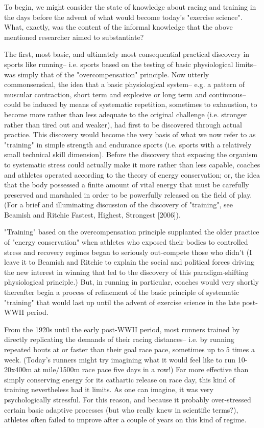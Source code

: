 To begin, we might consider the state of knowledge about racing and training in the days before the advent of what would become today's "exercise science". What, exactly, was the content of the informal knowledge that the above mentioned researcher aimed to substantiate?

The first, most basic, and ultimately most consequential practical discovery in sports like running-- i.e. sports based on the testing of basic physiological limits-- was simply that of the "overcompensation" principle. Now utterly commonsensical, the idea that a basic physiological system-- e.g. a pattern of muscular contraction, short term and explosive or long term and continuous-- could be induced by means of systematic repetition, sometimes to exhaustion, to become more rather than less adequate to the original challenge (i.e. stronger rather than tired out and weaker), had first to be discovered through actual practice. This discovery would become the very basis of what we now refer to as "training" in simple strength and endurance sports (i.e. sports with a relatively small technical skill dimension). Before the discovery that exposing the organism to systematic stress could actually make it more rather than less capable, coaches and athletes operated according to the theory of energy conservation; or, the idea that the body possessed a finite amount of vital energy that must be carefully preserved and marshaled in order to be powerfully released on the field of play. (For a brief and illuminating discussion of the discovery of "training", see Beamish and Ritchie Fastest, Highest, Strongest [2006]).

"Training" based on the overcompensation principle supplanted the older practice of "energy conservation" when athletes who exposed their bodies to controlled stress and recovery regimes began to seriously out-compete those who didn't (I leave it to Beamish and Ritchie to explain the social and political forces driving the new interest in winning that led to the discovery of this paradigm-shifting physiological principle.) But, in running in particular, coaches would very shortly thereafter begin a process of refinement of the basic principle of systematic "training" that would last up until the advent of exercise science in the late post-WWII period.

From the 1920s until the early post-WWII period, most runners trained by directly replicating the demands of their racing distances-- i.e. by running repeated bouts at or faster than their goal race pace, sometimes up to 5 times a week. (Today's runners might try imagining what it would feel like to run 10-20x400m at mile/1500m race pace five days in a row!) Far more effective than simply conserving energy for its cathartic release on race day, this kind of training nevertheless had it limits. As one can imagine, it was very psychologically stressful. For this reason, and because it probably over-stressed certain basic adaptive processes (but who really knew in scientific terms?), athletes often failed to improve after a couple of years on this kind of regime.

